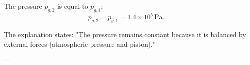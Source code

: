The pressure \( p_{g,2} \) is equal to \( p_{g,1} \):  
\[
p_{g,2} = p_{g,1} = 1.4 \times 10^5 \, \text{Pa}.
\]  

The explanation states:  
"The pressure remains constant because it is balanced by external forces (atmospheric pressure and piston)."

---